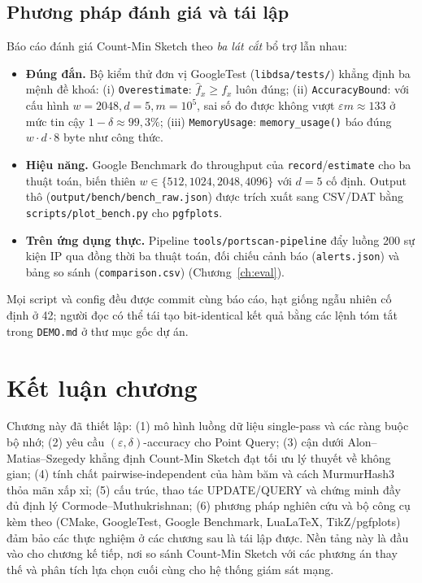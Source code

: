 \subsection{Phương pháp đánh giá và tái lập}
\label{sec:evaluation-methodology}

Báo cáo đánh giá Count-Min Sketch theo \textit{ba lát cắt} bổ trợ lẫn nhau:

\begin{itemize}
  \item \textbf{Đúng đắn.} Bộ kiểm thử đơn vị GoogleTest (\texttt{libdsa/tests/}) khẳng định ba mệnh đề khoá: (i) \texttt{Overestimate}: $\hat f_x \ge f_x$ luôn đúng; (ii) \texttt{AccuracyBound}: với cấu hình $w=2048, d=5, m=10^5$, sai số đo được không vượt $\varepsilon m \approx 133$ ở mức tin cậy $1-\delta \approx 99{,}3\%$; (iii) \texttt{MemoryUsage}: \texttt{memory\_usage()} báo đúng $w \cdot d \cdot 8$ byte như công thức.
  \item \textbf{Hiệu năng.} Google Benchmark đo throughput của \texttt{record}/\texttt{estimate} cho ba thuật toán, biến thiên $w \in \{512, 1024, 2048, 4096\}$ với $d = 5$ cố định. Output thô (\texttt{output/bench/bench\_raw.json}) được trích xuất sang CSV/DAT bằng \texttt{scripts/plot\_bench.py} cho \texttt{pgfplots}.
  \item \textbf{Trên ứng dụng thực.} Pipeline \texttt{tools/portscan-pipeline} đẩy luồng 200 sự kiện IP qua đồng thời ba thuật toán, đối chiếu cảnh báo (\texttt{alerts.json}) và bảng so sánh (\texttt{comparison.csv}) (Chương~\ref{ch:eval}).
\end{itemize}

\noindent Mọi script và config đều được commit cùng báo cáo, hạt giống ngẫu nhiên cố định ở 42; người đọc có thể tái tạo bit-identical kết quả bằng các lệnh tóm tắt trong \texttt{DEMO.md} ở thư mục gốc dự án.

\section{Kết luận chương}

Chương này đã thiết lập: (1) mô hình luồng dữ liệu single-pass và các ràng buộc bộ nhớ; (2) yêu cầu $(\varepsilon, \delta)$-accuracy cho Point Query; (3) cận dưới Alon--Matias--Szegedy khẳng định Count-Min Sketch đạt tối ưu lý thuyết về không gian; (4) tính chất pairwise-independent của hàm băm và cách MurmurHash3 thỏa mãn xấp xỉ; (5) cấu trúc, thao tác UPDATE/QUERY và chứng minh đầy đủ định lý Cormode--Muthukrishnan; (6) phương pháp nghiên cứu và bộ công cụ kèm theo (CMake, GoogleTest, Google Benchmark, LuaLaTeX, TikZ/pgfplots) đảm bảo các thực nghiệm ở các chương sau là tái lập được. Nền tảng này là đầu vào cho chương kế tiếp, nơi so sánh Count-Min Sketch với các phương án thay thế và phân tích lựa chọn cuối cùng cho hệ thống giám sát mạng.
